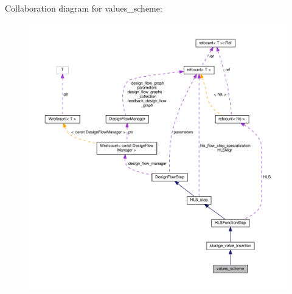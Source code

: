 Collaboration diagram for values\+\_\+scheme\+:
\nopagebreak
\begin{figure}[H]
\begin{center}
\leavevmode
\includegraphics[width=350pt]{db/de0/classvalues__scheme__coll__graph}
\end{center}
\end{figure}
